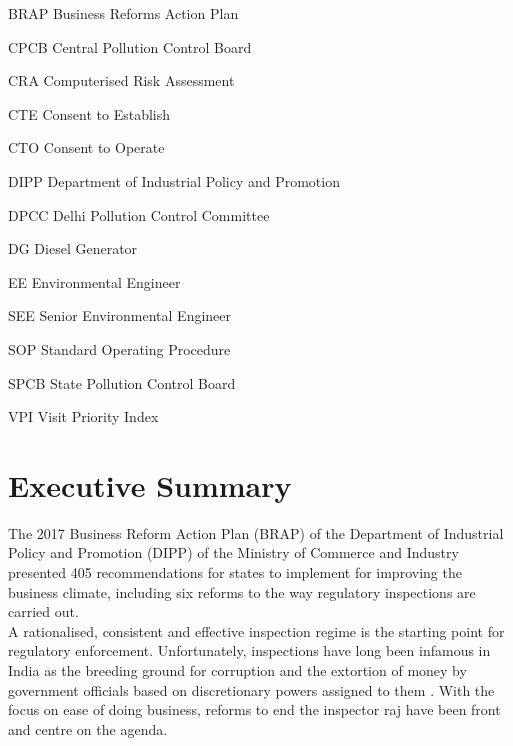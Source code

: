 \documentclass[a4paper, 12pt]{article}
\begin{document}
       
        
        \begin{abbrv}
        \item[BRAP]			Business Reforms Action Plan
        \item[CPCB]			Central Pollution Control Board
        \item[CRA]			Computerised Risk Assessment
        \item[CTE]				Consent to Establish
        \item[CTO]			Consent to Operate
        \item[DIPP]			Department of Industrial Policy and Promotion
        \item[DPCC]			Delhi Pollution Control Committee
        \item[DG]				Diesel Generator
        \item[EE]				Environmental Engineer
        \item[SEE]		                 Senior Environmental Engineer
        \item[SOP]			Standard Operating Procedure
        \item[SPCB]			State Pollution Control Board
        \item[VPI]				Visit Priority Index 
          
        
         
        \end{abbrv}
        
                    
                    \newpage
                    \section*{Executive Summary}
                    The 2017 Business Reform Action Plan (BRAP) of the Department of Industrial Policy and Promotion (DIPP) of the Ministry of Commerce and Industry presented 405 recommendations for states to implement for improving the business climate, including six reforms to the way regulatory inspections are carried out. \\
                  
                  A rationalised, consistent and effective inspection regime is the starting point for regulatory enforcement. Unfortunately, inspections have long been infamous in India as the breeding ground for corruption and the extortion of money by government officials based on discretionary powers assigned to them \parencite{PHD}. With the focus on ease of doing business, reforms to end the inspector raj \parencite{livemintnews} have been front and centre on the agenda. \\
                  
\end{document}
